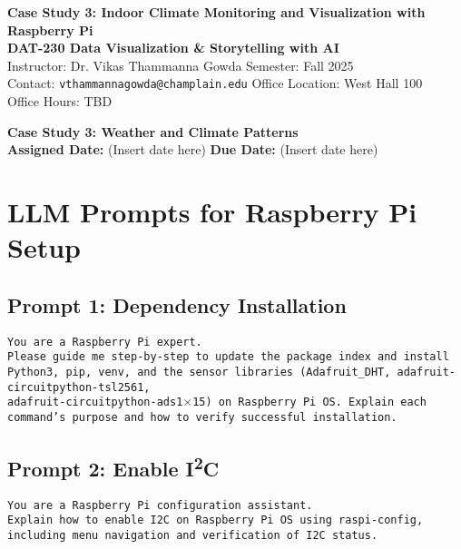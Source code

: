 \documentclass[11pt]{article}
\begin{document}
\begin{center}
  {\LARGE \textbf{Case Study 3: Indoor Climate Monitoring and Visualization with Raspberry Pi}}\\[0.5em]
  {\Large \textbf{DAT-230 Data Visualization \& Storytelling with AI}}\\[0.5em]
  {\small Instructor: Dr. Vikas Thammanna Gowda \quad\quad Semester: Fall 2025}\\
  {\small Contact: \texttt{vthammannagowda@champlain.edu} \quad\quad Office Location: West Hall 100}\\
    {\small Office Hours: TBD}\\
\end{center}


\noindent \textbf{Case Study 3: Weather and Climate Patterns}\\
\noindent \textbf{Assigned Date:} (Insert date here) \hfill \textbf{Due Date:} (Insert date here)\\[2ex]


\section*{LLM Prompts for Raspberry Pi Setup}


\subsection*{Prompt 1: Dependency Installation}
  
 \texttt{You are a Raspberry Pi expert. \\
Please guide me step-by-step to update the package index and install 
Python3, pip, venv, and the sensor libraries (Adafruit\_DHT, 
adafruit-circuitpython-tsl2561, \\
adafruit-circuitpython-ads1$\times$15) 
on Raspberry Pi OS. 
Explain each 
command's 
purpose 
and how to verify successful installation.}
  

\subsection*{Prompt 2: Enable I\textsuperscript{2}C}

 \texttt{You are a Raspberry Pi configuration assistant. \\
Explain how to enable I2C on Raspberry Pi OS using raspi-config, including menu 
navigation and verification of I2C status.
 }
\end{document}
